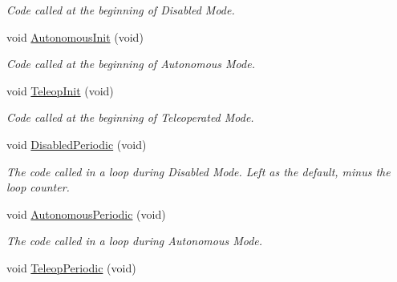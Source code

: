 \begin{DoxyCompactItemize}
\begin{DoxyCompactList}\small\item\em Code called at the beginning of Disabled Mode. \item\end{DoxyCompactList}\item 
\hypertarget{class_builtin_default_code_a727ebabf0678af822d53f90f96bfd679}{
void \hyperlink{class_builtin_default_code_a727ebabf0678af822d53f90f96bfd679}{AutonomousInit} (void)}
\label{class_builtin_default_code_a727ebabf0678af822d53f90f96bfd679}

\begin{DoxyCompactList}\small\item\em Code called at the beginning of Autonomous Mode. \item\end{DoxyCompactList}\item 
\hypertarget{class_builtin_default_code_ab3d70e0754e54bab03b130e6c042e0b5}{
void \hyperlink{class_builtin_default_code_ab3d70e0754e54bab03b130e6c042e0b5}{TeleopInit} (void)}
\label{class_builtin_default_code_ab3d70e0754e54bab03b130e6c042e0b5}

\begin{DoxyCompactList}\small\item\em Code called at the beginning of Teleoperated Mode. \item\end{DoxyCompactList}\item 
\hypertarget{class_builtin_default_code_a504e7d9b01a66635c31597f9a58cf478}{
void \hyperlink{class_builtin_default_code_a504e7d9b01a66635c31597f9a58cf478}{DisabledPeriodic} (void)}
\label{class_builtin_default_code_a504e7d9b01a66635c31597f9a58cf478}

\begin{DoxyCompactList}\small\item\em The code called in a loop during Disabled Mode. Left as the default, minus the loop counter. \item\end{DoxyCompactList}\item 
\hypertarget{class_builtin_default_code_a26da787e2abf683077e266ad44049ca0}{
void \hyperlink{class_builtin_default_code_a26da787e2abf683077e266ad44049ca0}{AutonomousPeriodic} (void)}
\label{class_builtin_default_code_a26da787e2abf683077e266ad44049ca0}

\begin{DoxyCompactList}\small\item\em The code called in a loop during Autonomous Mode. \item\end{DoxyCompactList}\item 
\hypertarget{class_builtin_default_code_a79dd68c3dba134d041413df30862aae2}{
void \hyperlink{class_builtin_default_code_a79dd68c3dba134d041413df30862aae2}{TeleopPeriodic} (void)}
\label{class_builtin_default_code_a79dd68c3dba134d041413df30862aae2}


\end{DoxyCompactItemize}
